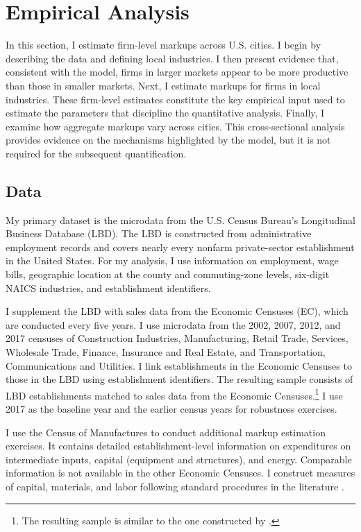 \section{Empirical Analysis}\label{s:empanal}
In this section, I estimate firm-level markups across U.S. cities. I begin by describing the data and defining local industries. I then present evidence that, consistent with the model, firms in larger markets appear to be more productive than those in smaller markets. Next, I estimate markups for firms in local industries. These firm-level estimates constitute the key empirical input used to estimate the parameters that discipline the quantitative analysis. Finally, I examine how aggregate markups vary across cities. This cross-sectional analysis provides evidence on the mechanisms highlighted by the model, but it is not required for the subsequent quantification.

\subsection{Data}
My primary dataset is the microdata from the U.S. Census Bureau’s Longitudinal Business Database (LBD). The LBD is constructed from administrative employment records and covers nearly every nonfarm private-sector establishment in the United States. For my analysis, I use information on employment, wage bills, geographic location at the county and commuting-zone levels, six-digit NAICS industries, and establishment identifiers.

I supplement the LBD with sales data from the Economic Censuses (EC), which are conducted every five years. I use microdata from the 2002, 2007, 2012, and 2017 censuses of Construction Industries, Manufacturing, Retail Trade, Services, Wholesale Trade, Finance, Insurance and Real Estate, and Transportation, Communications and Utilities. I link establishments in the Economic Censuses to those in the LBD using establishment identifiers. The resulting sample consists of LBD establishments matched to sales data from the Economic Censuses.\footnote{The resulting sample is similar to the one constructed by \textcite{Hsieh&RossiHansberg23}.} I use 2017 as the baseline year and the earlier census years for robustness exercises.

I use the Census of Manufactures to conduct additional markup estimation exercises. It contains detailed establishment-level information on expenditures on intermediate inputs, capital (equipment and structures), and energy. Comparable information is not available in the other Economic Censuses. I construct measures of capital, materials, and labor following standard procedures in the literature \parencite{FosterGrim&Haltiwanger16}.

